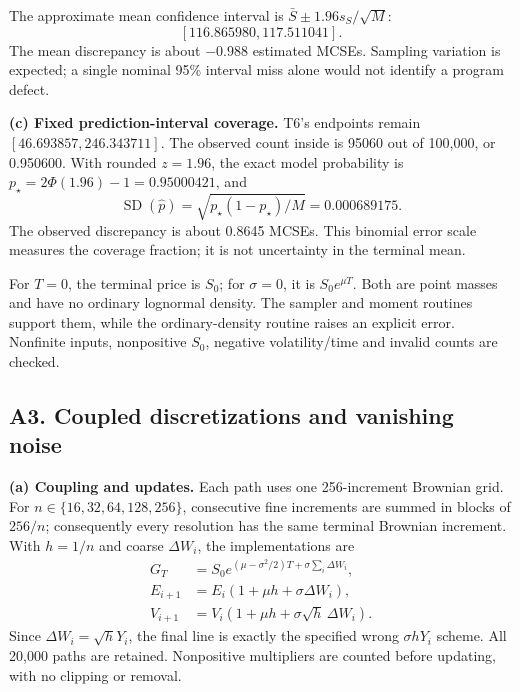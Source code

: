 The approximate mean confidence interval is $\bar S\pm1.96s_S/\sqrt M$:
\[
 [116.865980, 117.511041].
\]
The mean discrepancy is about $-0.988$ estimated MCSEs. Sampling variation is expected; a single nominal 95\% interval miss alone would not identify a program defect.

\textbf{(c) Fixed prediction-interval coverage.} T6's endpoints remain
$[46.693857,246.343711]$. The observed count inside is 95060 out of 100,000, or 0.950600. With rounded $z=1.96$, the exact model probability is $p_\star=2\Phi(1.96)-1=0.95000421$, and
\[
 \operatorname{SD}(\widehat p)=\sqrt{p_\star(1-p_\star)/M}=0.000689175.
\]
The observed discrepancy is about 0.8645 MCSEs. This binomial error scale measures the coverage fraction; it is not uncertainty in the terminal mean.

For $T=0$, the terminal price is $S_0$; for $\sigma=0$, it is $S_0e^{\mu T}$. Both are point masses and have no ordinary lognormal density. The sampler and moment routines support them, while the ordinary-density routine raises an explicit error. Nonfinite inputs, nonpositive $S_0$, negative volatility/time and invalid counts are checked.
\clearpage
\subsection{A3. Coupled discretizations and vanishing noise}
\textbf{(a) Coupling and updates.} Each path uses one 256-increment Brownian grid. For $n\in\{16,32,64,128,256\}$, consecutive fine increments are summed in blocks of $256/n$; consequently every resolution has the same terminal Brownian increment. With $h=1/n$ and coarse $\Delta W_i$, the implementations are
\begin{align*}
 G_T&=S_0e^{(\mu-\sigma^2/2)T+\sigma\sum_i\Delta W_i},\\
 E_{i+1}&=E_i(1+\mu h+\sigma\Delta W_i),\\
 V_{i+1}&=V_i(1+\mu h+\sigma\sqrt h\,\Delta W_i).
\end{align*}
Since $\Delta W_i=\sqrt hY_i$, the final line is exactly the specified wrong $\sigma hY_i$ scheme. All 20,000 paths are retained. Nonpositive multipliers are counted before updating, with no clipping or removal.

